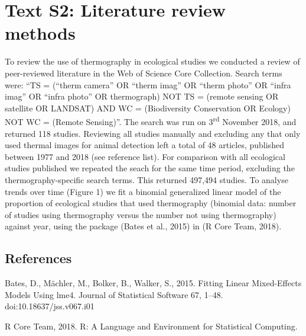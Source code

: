 \documentclass[12pt,british,a4paper,]{article}
\theoremstyle{definition}
\theoremstyle{definition}
\theoremstyle{definition}
\theoremstyle{remark}
\begin{document}
\pagebreak
\section{Text S2: Literature review methods}

To review the use of thermography in ecological studies we conducted a review of peer-reviewed literature in the Web of Science Core Collection. Search terms were: ``TS = (``therm\* camera'' OR ``therm\* imag\*'' OR ``therm\* photo'' OR ``infra\* imag\*'' OR ``infra\* photo'' OR thermograph\*) NOT TS = (remote sensing OR satellite OR LANDSAT) AND WC = (Biodiversity Conservation OR Ecology) NOT WC = (Remote Sensing)''. The search was run on 3\textsuperscript{rd} November 2018, and returned 118 studies. Reviewing all studies manually and excluding any that only used thermal images for animal detection left a total of 48 articles, published between 1977 and 2018 (see reference list). For comparison with all ecological studies published we repeated the seach for the same time period, excluding the thermography-specific search terms. This returned 497,494 studies. To analyse trends over time (Figure 1) we fit a binomial generalized linear model of the proportion of ecological studies that used thermography (binomial data: number of studies using thermography versus the number not using thermography) against year, using the package  (Bates et al., 2015) in  (R Core Team, 2018).

\nocite{*}

\subsection*{References}

Bates, D., Mächler, M., Bolker, B., Walker, S., 2015. Fitting Linear Mixed-Effects Models Using lme4. Journal of Statistical Software 67, 1–48. doi:10.18637/jss.v067.i01

R Core Team, 2018. R: A Language and Environment for Statistical Computing.

\renewcommand\bibsection{\subsection*{\refname}}
\renewcommand\refname{Thermography literature}


\end{document}
